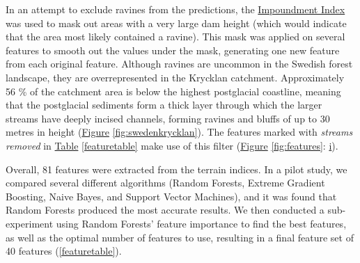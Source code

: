 \documentclass[11pt, review]{elsarticle} %
\begin{document}
\label{impoundmentstreamremoval}
In an attempt to exclude ravines from the predictions, the \hyperref[impoundment]{Impoundment Index} was used to mask out areas with a very large dam height (which would indicate that the area most likely contained a ravine). This mask was applied on several features to smooth out the values under the mask, generating one new feature from each original feature. Although ravines are uncommon in the Swedish forest landscape, they are overrepresented in the Krycklan catchment. Approximately 56 \% of the catchment area is below the highest postglacial coastline, meaning that the postglacial sediments form a thick layer through which the larger streams have deeply incised channels, forming ravines and bluffs of up to 30 metres in height (\hyperref[fig:swedenkrycklan]{Figure} \ref{fig:swedenkrycklan}). The features marked with \textit{streams removed} in \hyperref[featuretable]{Table} \ref{featuretable} make use of this filter (\hyperref[fig:features]{Figure} \ref{fig:features}: \hyperref[fig:features]{i}).

Overall, 81 features were extracted from the terrain indices. In a pilot study, we compared several different algorithms (Random Forests, Extreme Gradient Boosting, Naive Bayes, and Support Vector Machines), and it was found that Random Forests produced the most accurate results. We then conducted a sub-experiment using Random Forests' feature importance to find the best features, as well as the optimal number of features to use, resulting in a final feature set of 40 features (\autoref{featuretable}).
\end{document}
